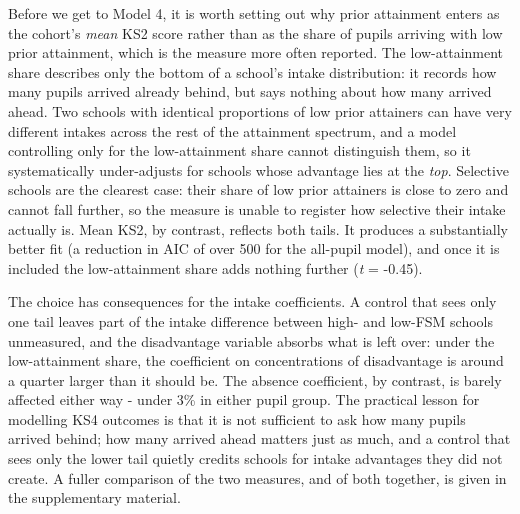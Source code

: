 \documentclass[
  12pt,
  titlepage]{article}
\begin{document}
Before we get to Model 4, it is worth setting out why prior attainment
enters as the cohort's \emph{mean} KS2 score rather than as the share of
pupils arriving with low prior attainment, which is the measure more
often reported. The low-attainment share describes only the bottom of a
school's intake distribution: it records how many pupils arrived already
behind, but says nothing about how many arrived ahead. Two schools with
identical proportions of low prior attainers can have very different
intakes across the rest of the attainment spectrum, and a model
controlling only for the low-attainment share cannot distinguish them,
so it systematically under-adjusts for schools whose advantage lies at
the \emph{top}. Selective schools are the clearest case: their share of
low prior attainers is close to zero and cannot fall further, so the
measure is unable to register how selective their intake actually is.
Mean KS2, by contrast, reflects both tails. It produces a substantially
better fit (a reduction in AIC of over 500 for the all-pupil model), and
once it is included the low-attainment share adds nothing further
(\emph{t} = -0.45).

The choice has consequences for the intake coefficients. A control that
sees only one tail leaves part of the intake difference between high-
and low-FSM schools unmeasured, and the disadvantage variable absorbs
what is left over: under the low-attainment share, the coefficient on
concentrations of disadvantage is around a quarter larger than it should
be. The absence coefficient, by contrast, is barely affected either way
- under 3\% in either pupil group. The practical lesson for modelling
KS4 outcomes is that it is not sufficient to ask how many pupils arrived
behind; how many arrived ahead matters just as much, and a control that
sees only the lower tail quietly credits schools for intake advantages
they did not create. A fuller comparison of the two measures, and of
both together, is given in the supplementary material.
\end{document}

